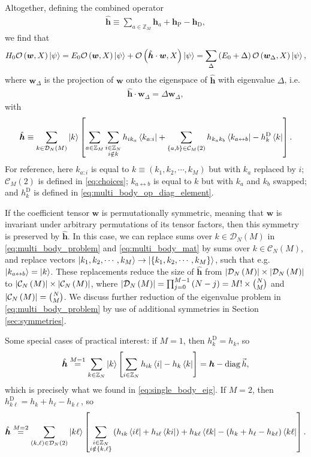 \documentclass[nofootinbib,notitlepage,11pt]{revtex4-2}
\renewcommand{\t}{\text} %
\newcommand{\p}[1]{\left(#1\right)} %
\renewcommand{\sp}[1]{\left[#1\right]} %
\renewcommand{\set}[1]{\left\{#1\right\}} %
\renewcommand{\c}{\cdot} %
\newcommand{\m}{\bm} %
\renewcommand{\v}{\vec} %
\newcommand{\1}{\mathds{1}}
\renewcommand{\i}{\mathrm{i}\mkern1mu}
\newcommand{\C}{\mathcal{C}}
\newcommand{\D}{\mathcal{D}}
\renewcommand{\O}{\mathcal{O}}
\newcommand{\ZZ}{\mathbb{Z}}
\DeclareMathOperator{\diag}{diag}
\newcommand{\lra}{\leftrightarrow}
\begin{document}
Altogether, defining the combined operator
\begin{align}
  \hat{\m h}
  \equiv \sum_{a\in\ZZ_M} \m h_a + \m h_{\t{P}} - \m h_{\t{D}},
\end{align}
we find that
\begin{align}
  H_0 \O\p{\m w,X} \ket\psi
  = E_0 \O\p{\m w,X} \ket\psi +
  \O\p{\hat{\m h}\c\m w, X} \ket\psi
  = \sum_\Delta \p{E_0+\Delta} \O\p{\m w_\Delta, X} \ket\psi,
\end{align}
where $\m w_\Delta$ is the projection of $\m w$ onto the eigenspace of
$\hat{\m h}$ with eigenvalue $\Delta$, i.e.
\begin{align}
  \hat{\m h} \c \m w_\Delta = \Delta \m w_\Delta,
  \label{eq:multi_body_problem}
\end{align}
with
\begin{align}
  \hat{\m h} \equiv \sum_{k\in\D_N\p{M}} \ket{k}
  \sp{\sum_{a\in\ZZ_M} \sum_{\substack{i\in\ZZ_N\\i\notin k}}
    h_{ik_a} \bra{k_{a:i}}
    + \sum_{\set{a,b}\in\C_M\p{2}} h_{k_ak_b} \bra{k_{a\lra b}}
    - h^{\t{D}}_k \bra{k}}.
  \label{eq:multi_body_mat}
\end{align}
For reference, here $k_{a:i}$ is equal to
$k\equiv\p{k_1,k_2,\cdots,k_M}$ but with $k_a$ replaced by $i$;
$\C_M\p{2}$ is defined in \eqref{eq:choices}; $k_{a\lra b}$ is equal
to $k$ but with $k_a$ and $k_b$ swapped; and $h^{\t{D}}_k$ is defined
in \eqref{eq:multi_body_op_diag_element}.

If the coefficient tensor $\m w$ is permutationally symmetric, meaning
that $\m w$ is invariant under arbitrary permutations of its tensor
factors, then this symmetry is preserved by $\hat{\m h}$.  In this
case, we can replace sums over $k\in\D_N\p{M}$ in
\eqref{eq:multi_body_problem} and \eqref{eq:multi_body_mat} by sums
over $k\in\C_N\p{M}$, and replace vectors
$\ket{k_1,k_2,\cdots,k_M}\to\ket{\set{k_1,k_2,\cdots,k_M}}$, such that
e.g.~$\ket{k_{a\lra b}}=\ket{k}$.  These replacements reduce the size
of $\hat{\m h}$ from $\abs{\D_N\p{M}}\times\abs{\D_N\p{M}}$ to
$\abs{\C_N\p{M}}\times\abs{\C_N\p{M}}$, where
$\abs{\D_N\p{M}}=\prod_{j=0}^{M-1}\p{N-j}=M!\times{N\choose M}$ and
$\abs{\C_N\p{M}}={N\choose M}$.  We discuss further reduction of the
eigenvalue problem in \eqref{eq:multi_body_problem} by use of
additional symmetries in Section \ref{sec:symmetries}.

Some special cases of practical interest: if $M=1$, then
$h^{\t{D}}_k=h_k$, so
\begin{align}
  \hat{\m h} \stackrel{M=1}{=} \sum_{k\in\ZZ_N} \ket{k}
  \sp{\sum_{i\in\ZZ_N} h_{ik} \bra{i} - h_k \bra{k}}
  = \m h - \diag\v h,
\end{align}
which is precisely what we found in \eqref{eq:single_body_eig}.  If
$M=2$, then $h_{k\ell}^{\t{D}}=h_k+h_\ell-h_{k\ell}$, so
\begin{align}
  \hat{\m h} \stackrel{M=2}{=}
  \sum_{\p{k,\ell}\in\D_N\p{2}} \ket{k\ell}
  \sp{\sum_{\substack{i\in\ZZ_N\\i\notin\set{k,\ell}}}
    \p{ h_{ik} \bra{i\ell} + h_{i\ell} \bra{ki} }
    + h_{k\ell} \bra{\ell k}
    - \p{h_k + h_\ell - h_{k\ell}} \bra{k\ell}}.
\end{align}
\end{document}
